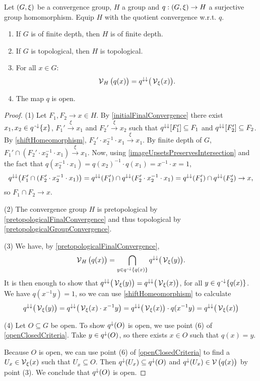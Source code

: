 \begin{proposition} \label{groupHomomorphismQuotient}
Let $\left( G, \xi \right)$ be a convergence group, $H$ a group and $q: \left( G, \xi \right) \to H$ a surjective group homomorphism. Equip $H$ with the quotient convergence w.r.t. $q$.
\begin{enumerate}
\item If $G$ is of finite depth, then $H$ is of finite depth.
\item If $G$ is topological, then $H$ is topological.
\item For all $x\in G$:
\[ \operatorname{\mathcal{V}}_H\big(q(x)\big) = q^{\downarrow\downarrow}\big(\operatorname{\mathcal{V}}_\xi(x)\big). \]
\item The map $q$ is open.
\end{enumerate}
\end{proposition}
\begin{proof}
(1) Let $F_1, F_2 \to x \in H$. By \ref{initialFinalConvergence} there exist $x_1, x_2\in q^{{\text{\hspace{0.15em}-}\downarrow}}\{x\}$, $F_1' \overset{\xi}{\longrightarrow} x_1$ and $F_2' \overset{\xi}{\longrightarrow} x_2$ such that $q^{\downarrow\downarrow}[F'_1] \subseteq F_1$ and $q^{\downarrow\downarrow}[F'_2] \subseteq F_2$. By \ref{shiftHomeomorphism}, $F_2'\cdot x_2^{-1}\cdot x_1 \overset{\xi}{\longrightarrow} x_1$. By finite depth of $G$, $F_1'\cap (F_2'\cdot x_2^{-1}\cdot x_1) \overset{\xi}{\longrightarrow} x_1$. Now, using \ref{imageUpsetsPreservesIntersection} and the fact that $q(x_2^{-1}\cdot x_1) = q(x_2)^{-1}\cdot q(x_1) = x^{-1}\cdot x = 1$,
\[ q^{\downarrow\downarrow}\big(F_1'\cap (F_2'\cdot x_2^{-1}\cdot x_1)\big) = q^{\downarrow\downarrow}(F_1')\cap q^{\downarrow\downarrow}(F_2'\cdot x_2^{-1}\cdot x_1) = q^{\downarrow\downarrow}(F_1')\cap q^{\downarrow\downarrow}(F_2') \to x, \]
so $F_1\cap F_2 \to x$.

(2) The convergence group $H$ is pretopological by \ref{pretopologicalFinalConvergence} and thus topological by \ref{pretopologicalGroupConvergence}.

(3) We have, by \ref{pretopologicalFinalConvergence},
\[ \operatorname{\mathcal{V}}_H\big(q(x)\big) = \bigcap_{y\in q^{{\text{\hspace{0.15em}-}\downarrow}}\{q(x)\}}q^{\downarrow\downarrow}\big(\operatorname{\mathcal{V}}_\xi(y)\big). \]
It is then enough to show that $q^{\downarrow\downarrow}\big(\operatorname{\mathcal{V}}_\xi(y)\big) = q^{\downarrow\downarrow}\big(\operatorname{\mathcal{V}}_\xi(x)\big)$, for all $y\in q^{{\text{\hspace{0.15em}-}\downarrow}}\{q(x)\}$. We have $q(x^{-1}y) = 1$, so we can use \ref{shiftHomeomorphism} to calculate
\[ q^{\downarrow\downarrow}\big(\operatorname{\mathcal{V}}_\xi(y)\big) = q^{\downarrow\downarrow}\big(\operatorname{\mathcal{V}}_\xi(x)\cdot x^{-1}y\big) = q^{\downarrow\downarrow}\big(\operatorname{\mathcal{V}}_\xi(x)\big)\cdot q(x^{-1}y) = q^{\downarrow\downarrow}\big(\operatorname{\mathcal{V}}_\xi(x)\big) \]

(4) Let $O\subseteq G$ be open. To show $q^\downarrow(O)$ is open, we use point (6) of \ref{openClosedCriteria}. Take $y\in q^{\downarrow}(O)$, so there exists $x\in O$ such that $q(x) = y$.

Because $O$ is open, we can use point (6) of \ref{openClosedCriteria} to find a $U_x\in \operatorname{\mathcal{V}}_\xi(x)$ such that $U_x \subseteq O$. Then $q^{\downarrow}(U_x) \subseteq q^\downarrow(O)$ and $q^{\downarrow}(U_x)\in \operatorname{\mathcal{V}}\big(q(x)\big)$ by point (3). We conclude that $q^{\downarrow}(O)$ is open.
\end{proof}

